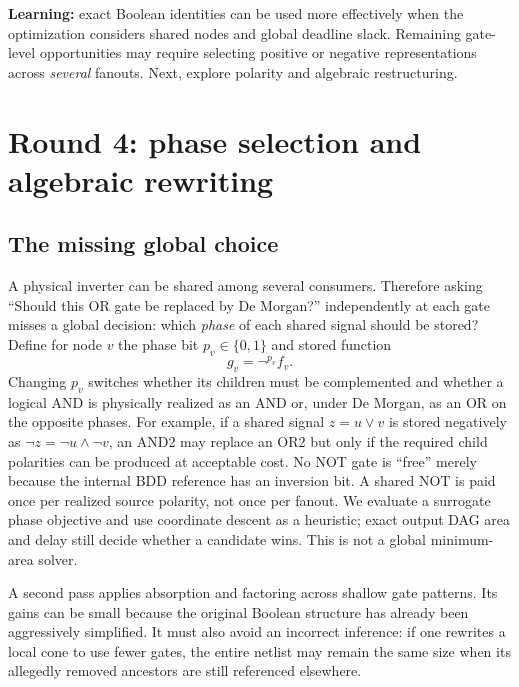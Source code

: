 \begin{tcolorbox}[colback=ResearchBlue!20,colframe=ResearchBlue,title=Decision after Round 3]
\textbf{Learning:} exact Boolean identities can be used more effectively when the optimization considers shared nodes and global deadline slack. Remaining gate-level opportunities may require selecting positive or negative representations across \emph{several} fanouts. Next, explore polarity and algebraic restructuring.
\end{tcolorbox}

\section{Round 4: phase selection and algebraic rewriting}
\subsection{The missing global choice}
A physical inverter can be shared among several consumers. Therefore asking ``Should this OR gate be replaced by De Morgan?'' independently at each gate misses a global decision: which \emph{phase} of each shared signal should be stored? Define for node $v$ the phase bit $p_v\in\{0,1\}$ and stored function
\begin{equation}
 g_v=\neg^{p_v}f_v.
\end{equation}
Changing $p_v$ switches whether its children must be complemented and whether a logical AND is physically realized as an AND or, under De Morgan, as an OR on the opposite phases. For example, if a shared signal $z=u\lor v$ is stored negatively as $\neg z=\neg u\land\neg v$, an AND2 may replace an OR2 but only if the required child polarities can be produced at acceptable cost. No NOT gate is ``free'' merely because the internal BDD reference has an inversion bit. A shared NOT is paid once per realized source polarity, not once per fanout. We evaluate a surrogate phase objective and use coordinate descent as a heuristic; exact output DAG area and delay still decide whether a candidate wins. This is not a global minimum-area solver.

A second pass applies absorption and factoring across shallow gate patterns. Its gains can be small because the original Boolean structure has already been aggressively simplified. It must also avoid an incorrect inference: if one rewrites a local cone to use fewer gates, the entire netlist may remain the same size when its allegedly removed ancestors are still referenced elsewhere.

